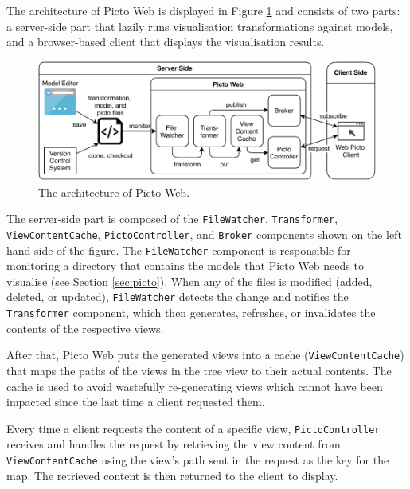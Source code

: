 \documentclass[sigconf,review]{acmart}
\begin{document}
The architecture of Picto Web is displayed in Figure \ref{fig:architecture} and consists of two parts: a server-side part that lazily runs visualisation transformations against models, and a browser-based client that displays the visualisation results. 


\begin{figure}[h]
  \centering
  \includegraphics[width=\linewidth]{images/architecture.pdf}
  \caption{The architecture of Picto Web.}
  \label{fig:architecture}
\end{figure}

The server-side part is composed of the \texttt{FileWatcher}, \texttt{Transformer}, \texttt{ViewContentCache}, \texttt{PictoController}, and \texttt{Broker} components shown on the left hand side of the figure. The \texttt{FileWatcher} component is responsible for monitoring a directory that contains the models that Picto Web needs to visualise (see Section \ref{sec:picto}). When any of the files is modified (added, deleted, or updated), \texttt{FileWatcher} detects the change and notifies the \texttt{Transformer} component, which then generates, refreshes, or invalidates the contents of the respective views. 

After that, Picto Web puts the generated views into a cache (\texttt{ViewContentCache}) that maps the paths of the views in the tree view to their actual contents. The cache is used to avoid wastefully re-generating views which cannot have been impacted since the last time a client requested them.

Every time a client requests the content of a specific view, \texttt{PictoController} receives and handles the request by retrieving the view content from \texttt{ViewContentCache} using the view's path sent in the request as the key for the map. The retrieved content is then returned to the client to display.
\end{document}
